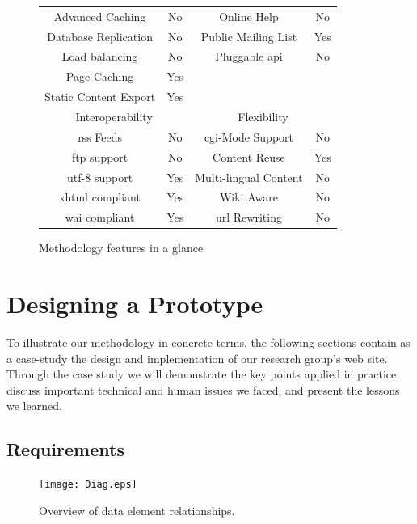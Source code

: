 \documentclass{elsart}
\begin{document}
\begin{figure}
\begin{center}
\begin{tabular}{c c | c c}
\hline
Advanced Caching & No & Online Help & No\\
Database Replication & No & Public Mailing List & Yes\\
Load balancing & No & Pluggable {\sc api} & No\\
Page Caching & Yes & &\\
Static Content Export & Yes & &\\
\hline
\multicolumn{2}{c|}{Interoperability} & \multicolumn{2}{c}{Flexibility}\\
\hline
{\sc rss} Feeds & No & {\sc cgi}-Mode Support & No\\
{\sc ftp} support & No & Content Reuse & Yes\\
{\sc utf-8} support & Yes & Multi-lingual Content & No\\
{\sc xhtml} compliant & Yes & Wiki Aware & No\\
{\sc wai} compliant & Yes & {\sc url} Rewriting & No\\
\hline
\end{tabular}
\end{center}
\caption{Methodology features in a glance}
\label{tbl:cms-matrix}
\end{figure}

\section{Designing a Prototype}

To illustrate our methodology in concrete terms, 
the following sections contain as a case-study the design and implementation
of our research group's web site.
Through the case study we will demonstrate the key points applied in
practice, discuss important technical and human issues we faced,
and present the lessons we learned.

\subsection{Requirements}
\label{sec:requirements}

\begin{figure}
\begin{center}
\texttt{[image: Diag.eps]}
\end{center}
\caption{Overview of data element relationships.}
\label{fig:diag}
\end{figure}
\end{document}
